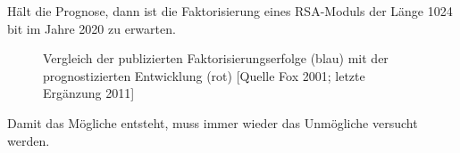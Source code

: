 \begin{refsegment}
Hält die Prognose, dann ist die Faktorisierung eines RSA-Moduls der Länge
1024 bit im Jahre 2020 zu erwarten.

\begin{figure}[ht] %
\begin{center}
\caption{Vergleich der publizierten Faktorisierungserfolge (blau) mit der
prognostizierten Entwicklung (rot) [Quelle Fox 2001; letzte Ergänzung 2011]}
\label{secorvo-factorisation-forecast}
\end{center}
\end{figure}




\begin{ctsquote}
    Damit das Mögliche entsteht, muss immer wieder das Unmögliche
    versucht werden.
\caption[Hermann Hesse]{Hermann Hesse\footnotemark}
\end{ctsquote}
\addtocounter{footnote}{0}


\end{refsegment}
